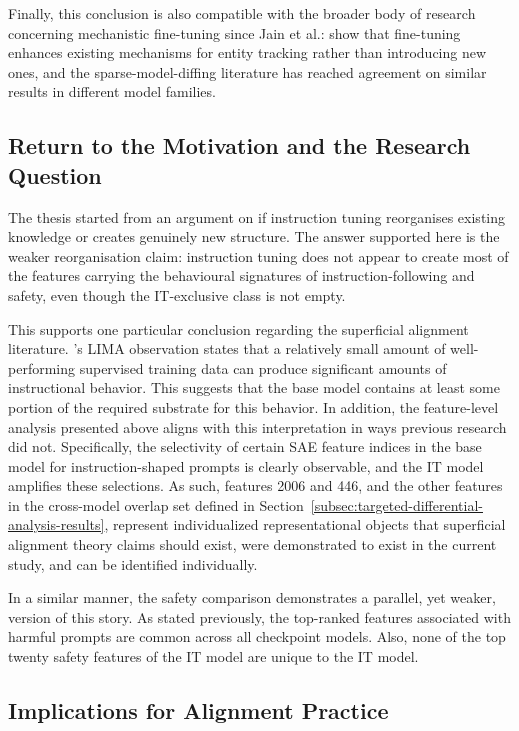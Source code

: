 Finally, this conclusion is also compatible with the broader body of research concerning mechanistic fine-tuning since Jain et al.: \textcite{prakash_fine-tuning_2024} show that fine-tuning enhances existing mechanisms for entity tracking rather than introducing new ones, and the sparse-model-diffing literature has reached agreement on similar results in different model families.

\subsection{Return to the Motivation and the Research Question}
\label{subsec:return-to-motivation-and-rq}

The thesis started from an argument on if instruction tuning reorganises existing knowledge or creates genuinely new structure. The answer supported here is the weaker reorganisation claim: instruction tuning does not appear to create most of the features carrying the behavioural signatures of instruction-following and safety, even though the IT-exclusive class is not empty.

This supports one particular conclusion regarding the superficial alignment literature. \textcite{zhou_lima_2023}'s LIMA observation states that a relatively small amount of well-performing supervised training data can produce significant amounts of instructional behavior. This suggests that the base model contains at least some portion of the required substrate for this behavior. In addition, the feature-level analysis presented above aligns with this interpretation in ways previous research did not. Specifically, the selectivity of certain SAE feature indices in the base model for instruction-shaped prompts is clearly observable, and the IT model amplifies these selections. As such, features 2006 and 446, and the other features in the cross-model overlap set defined in Section~\ref{subsec:targeted-differential-analysis-results}, represent individualized representational objects that superficial alignment theory claims should exist, were demonstrated to exist in the current study, and can be identified individually.

In a similar manner, the safety comparison demonstrates a parallel, yet weaker, version of this story. As stated previously, the top-ranked features associated with harmful prompts are common across all checkpoint models. Also, none of the top twenty safety features of the IT model are unique to the IT model.

\subsection{Implications for Alignment Practice}
\label{subsec:implications-for-alignment-practice}

